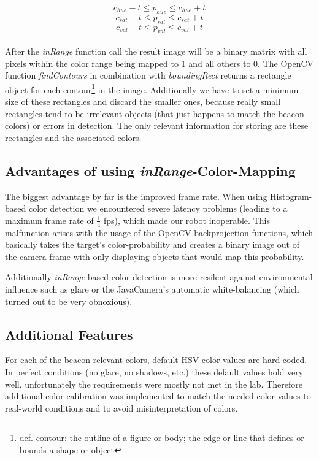 \documentclass[703031]{iisreport}
\begin{document}
\[c_{hue} - t \le p_{hue} \le c_{hue} + t\]
\[c_{sat} - t \le p_{sat} \le c_{sat} + t\]
\[c_{val} - t \le p_{val} \le c_{val} + t\]\\
After the \emph{inRange} function call\cite{opencv_man_arrays} the result image will be a binary matrix with all pixels within the color range being mapped to 1 and all others to 0. The OpenCV function \emph{findContours}\cite{opencv_man_struct_analysis} in combination with \emph{boundingRect}\cite{opencv_man_struct_analysis} returns a rectangle object for each contour\footnote{def. contour: the outline of a figure or body; the edge or line that defines or bounds a shape or object\cite{dict_contour}} in the image. Additionally we have to set a minimum size of these rectangles and discard the smaller ones, because really small rectangles tend to be irrelevant objects (that just happens to match the beacon colors) or errors in detection.
The only relevant information for storing are these rectangles and the associated colors. 

\subsection{Advantages of using \emph{inRange}-Color-Mapping}
The biggest advantage by far is the improved frame rate. When using Histogram-based color detection we encountered severe latency problems (leading to a maximum frame rate of $\frac{1}{4}$ fps), which made our robot inoperable. This malfunction arises with the usage of the OpenCV backprojection functions, which basically takes the target's color-probability and creates a binary image out of the camera frame with only displaying objects that would map this probability.

Additionally \emph{inRange} based color detection is more resilent against environmental influence such as glare or the JavaCamera's automatic white-balancing (which turned out to be very obnoxious).

\subsection{Additional Features}
For each of the beacon relevant colors, default HSV-color values are hard coded. In perfect conditions (no glare, no shadows, etc.) these default values hold very well, unfortunately the requirements were mostly not met in the lab. Therefore additional color calibration was implemented to match the needed color values to real-world conditions and to avoid misinterpretation of colors.
\end{document}
